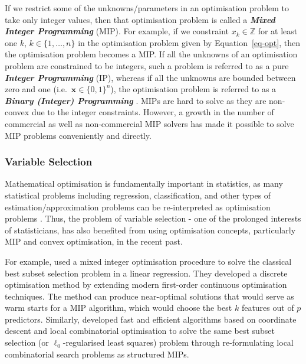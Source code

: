 \documentclass[
  11pt,
  a4paper,
]{article}
\begin{document}
If we restrict some of the unknowns/parameters in an optimisation
problem to take only integer values, then that optimisation problem is
called a \textbf{\emph{Mixed Integer Programming}} (MIP). For example,
if we constraint \(x_{k} \in \mathbb{Z}\) for at least one \(k\),
\(k \in \{1, \dots, n\}\) in the optimisation problem given by
Equation~\ref{eq-opt}, then the optimisation problem becomes a MIP. If
all the unknowns of an optimisation problem are constrained to be
integers, such a problem is referred to as a pure \textbf{\emph{Integer
Programming}} (IP), whereas if all the unknowns are bounded between zero
and one (i.e.~\(\bm{x} \in \{ 0, 1 \}^{n}\)), the optimisation problem
is referred to as a \textbf{\emph{Binary (Integer) Programming}}
\autocite{Theusl2020}. MIPs are hard to solve as they are non-convex due
to the integer constraints. However, a growth in the number of
commercial as well as non-commercial MIP solvers has made it possible to
solve MIP problems conveniently and directly.

\subsubsection{Variable Selection}\label{variable-selection}

Mathematical optimisation is fundamentally important in statistics, as
many statistical problems including regression, classification, and
other types of estimation/approximation problems can be re-interpreted
as optimisation problems \autocite{Theusl2020}. Thus, the problem of
variable selection - one of the prolonged interests of statisticians,
has also benefited from using optimisation concepts, particularly MIP
and convex optimisation, in the recent past.

For example, \textcite{Bertsimas2016} used a mixed integer optimisation
procedure to solve the classical best subset selection problem in a
linear regression. They developed a discrete optimisation method by
extending modern first-order continuous optimisation techniques. The
method can produce near-optimal solutions that would serve as warm
starts for a MIP algorithm, which would choose the best \(k\) features
out of \(p\) predictors. Similarly, \textcite{Hazimeh2020} developed
fast and efficient algorithms based on coordinate descent and local
combinatorial optimisation to solve the same best subset selection (or
\(\ell_{0}\)-regularised least squares) problem through re-formulating
local combinatorial search problems as structured MIPs.
\end{document}
